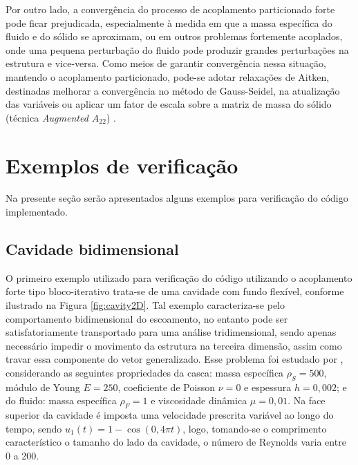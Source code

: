 Por outro lado, a convergência do processo de acoplamento particionado forte pode ficar prejudicada, especialmente à medida em que a massa específica do fluido e do sólido se aproximam, ou em outros problemas fortemente acoplados, onde uma pequena perturbação do fluido pode produzir grandes perturbações na estrutura e vice-versa. Como meios de garantir convergência nessa situação, mantendo o acoplamento particionado, pode-se adotar relaxações de Aitken, destinadas melhorar a convergência no método de Gauss-Seidel, na atualização das variáveis \cite{fernandes2019ale} ou aplicar um fator de escala sobre a matriz de massa do sólido (técnica \textit{Augmented $A_{22}$}) \cite{bazilevs2013computational}.

\section{Exemplos de verificação}

Na presente seção serão apresentados alguns exemplos para verificação do código implementado.

\subsection{Cavidade bidimensional} \label{FSI-Cavity2D}

O primeiro exemplo utilizado para verificação do código utilizando o acoplamento forte tipo bloco-iterativo trata-se de uma cavidade com fundo flexível, conforme ilustrado na Figura \ref{fig:cavity2D}. Tal exemplo caracteriza-se pelo comportamento bidimensional do escoamento, no entanto pode ser satisfatoriamente transportado para uma análise tridimensional, sendo apenas necessário impedir o movimento da estrutura na terceira dimensão, assim como travar essa componente do vetor generalizado. Esse problema foi estudado por , considerando as seguintes propriedades da casca: massa específica $\rho_S=500$, módulo de Young $E=250$, coeficiente de Poisson $\nu=0$ e espessura $h=0,002$; e do fluido: massa específica $\rho_F=1$ e viscosidade dinâmica $\mu=0,01$. Na face superior da cavidade é imposta uma velocidade prescrita variável ao longo do tempo, sendo $u_1(t)=1-\cos{(0,4\pi t)}$, logo, tomando-se o comprimento característico o tamanho do lado da cavidade, o número de Reynolds varia entre 0 a 200.

